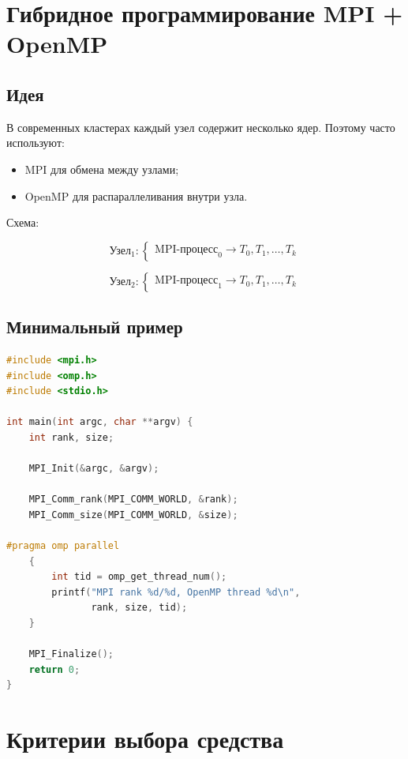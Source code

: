 \documentclass[12pt,a4paper]{article}
\begin{document}
\section{Гибридное программирование MPI + OpenMP}

\subsection{Идея}

В современных кластерах каждый узел содержит несколько ядер. Поэтому часто используют:
\begin{itemize}
    \item MPI для обмена между узлами;
    \item OpenMP для распараллеливания внутри узла.
\end{itemize}

Схема:

\[
\text{Узел}_1:
\begin{cases}
\text{MPI-процесс}_0 \rightarrow T_0,T_1,\ldots,T_k
\end{cases}
\]

\[
\text{Узел}_2:
\begin{cases}
\text{MPI-процесс}_1 \rightarrow T_0,T_1,\ldots,T_k
\end{cases}
\]

\subsection{Минимальный пример}

\begin{lstlisting}[language=C]
#include <mpi.h>
#include <omp.h>
#include <stdio.h>

int main(int argc, char **argv) {
    int rank, size;

    MPI_Init(&argc, &argv);

    MPI_Comm_rank(MPI_COMM_WORLD, &rank);
    MPI_Comm_size(MPI_COMM_WORLD, &size);

#pragma omp parallel
    {
        int tid = omp_get_thread_num();
        printf("MPI rank %d/%d, OpenMP thread %d\n",
               rank, size, tid);
    }

    MPI_Finalize();
    return 0;
}
\end{lstlisting}

\section{Критерии выбора средства}
\end{document}
